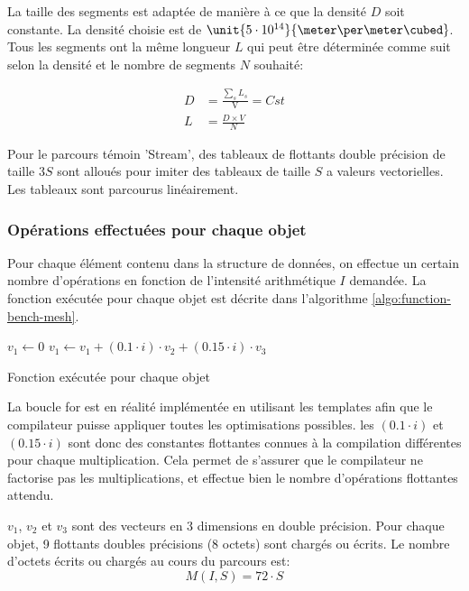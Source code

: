  La taille des segments est adaptée de manière à ce que la densité $D$ soit constante. La densité choisie est de $\unit{5\cdot10^{14}}{\meter \per \meter \cubed}$. Tous les segments ont la même longueur $L$ qui peut être déterminée comme suit selon la densité et le nombre de segments $N$ souhaité:

\begin{align}
D & = \frac{\sum_{s}{} L_s}{\text{V}} = Cst \\
L & = \frac{ D\times V }{N}
\end{align}



Pour le parcours témoin 'Stream', des tableaux de flottants double précision de taille $3 S$ sont alloués pour imiter des tableaux de taille $S$ a valeurs vectorielles. Les tableaux sont parcourus linéairement.

\subsubsection{Opérations effectuées pour chaque objet}

Pour chaque élément contenu dans la structure de données, on effectue un certain nombre d'opérations en fonction de l'intensité arithmétique $I$ demandée. La fonction exécutée pour chaque objet est décrite dans l'algorithme \ref{algo:function-bench-mesh}. 

\begin{algorithm}[H]
	\SetAlgoLined
	\LinesNumbered
	\SetAlgoNoEnd	
	\DontPrintSemicolon
	
	$v_1 \leftarrow 0$\;
	{
		$v_1 \leftarrow v_1 + (0.1 \cdot i )\cdot v_2 + (0.15 \cdot i) \cdot v_3$\;
	}
	
	\caption{Fonction exécutée pour chaque objet}
\end{algorithm}

La boucle for est en réalité implémentée en utilisant les templates afin que le compilateur puisse appliquer toutes les optimisations possibles. les $(0.1 \cdot i)$ et $(0.15 \cdot i)$ sont donc des constantes flottantes connues à la compilation différentes pour chaque multiplication. Cela permet de s'assurer que le compilateur ne factorise pas les multiplications, et effectue bien le nombre d'opérations flottantes attendu.

$v_1$, $v_2$ et $v_3$ sont des vecteurs en 3 dimensions en double précision. Pour chaque objet, 9 flottants doubles précisions (8 octets) sont chargés ou écrits. Le nombre d'octets écrits ou chargés au cours du parcours est:
\begin{equation}
	M(I,S) = 72 \cdot S
\end{equation}

